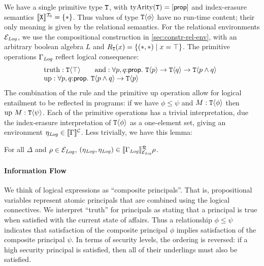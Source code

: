 We have a single primitive type $\textup{\texttt{T}}$, with
$\mathrm{tyArity}(\textup{\texttt{T}}) = [\mathsf{prop}]$ and index-erasure
semantics $\llbracket \textup{\texttt{X}} \rrbracket^{\mathcal{T}_0} = \{ * \}$. Thus values of type
$\textup{\texttt{T}}\langle \phi \rangle$ have no run-time content; their only meaning is
given by the relational semantics. For the relational environments
$\mathcal{E}_{\mathit{Log}}$, we use the compositional construction in
\autoref{sec:constr-rel-env}, with an arbitrary boolean algebra $L$
and $R_{\textup{\texttt{T}}}(x) = \{ (*,*) \mathrel| x = \top \}$.  The
primitive operations $\Gamma_{\mathit{Log}}$ reflect logical consequence:
\begin{displaymath}
  \begin{array}{l}
  \begin{array}{@{}c@{\hspace{2em}}c}
    \mathrm{truth} : \tyPrim{T}{\top} &
    \mathrm{and}   : \forall p, q\mathord:\mathsf{prop}.\ \tyPrim{T}{p} \to \tyPrim{T}{q} \to \tyPrim{T}{p \land q}
  \end{array} \\
  \mathrm{up} : \forall p, q\mathord:\mathsf{prop}.\ \tyPrim{T}{p \land q} \to \tyPrim{T}{p}
\end{array}
\end{displaymath}
The combination of the  rule and the primitive
$\mathrm{up}$ operation allow for logical entailment to be reflected
in programs: if we have $\phi \leq \psi$ and $M : \textup{\texttt{T}}\langle \phi \rangle$
then $\mathrm{up}\ M : \textup{\texttt{T}}\langle \psi \rangle$. Each of the primitive
operations has a trivial interpretation, due the index-erasure
interpretation of $\textup{\texttt{T}}\langle \phi \rangle$ as a one-element set, giving an
environment $\eta_{\mathit{Log}} \in \llbracket \Gamma \rrbracket^{\mathcal{C}}$. Less trivially, we
have this lemma:
\begin{lemma}\label{lem:environments-information-flow}
  For all $\Delta$ and $\rho \in \mathcal{E}_{\mathit{Log}}$, $(\eta_{\mathit{Log}}, \eta_{\mathit{Log}}) \in \llbracket \Gamma_{\mathit{Log}} \rrbracket^{\mathcal{R}}_{\mathcal{E}_{\mathit{Log}}}{\rho}$.
\end{lemma}

\paragraph{Information Flow} We think of logical expressions as
``composite principals''. That is, propositional variables represent
atomic principals that are combined using the logical connectives. We
interpret ``truth'' for principals as stating that a principal is true
when satisfied with the current state of affairs. Thus a relationship
$\phi \leq \psi$ indicates that satisfaction of the composite
principal $\phi$ implies satisfaction of the composite principal
$\psi$. In terms of security levels, the ordering is reversed: if a
high security principal is satisfied, then all of their underlings
must also be satisfied.

